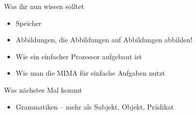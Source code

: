 %







\begin{frame}	
	\begin{block}{Was ihr nun wissen solltet}
		\begin{itemize}
			\item Speicher
			\item Abbildungen, die Abbildungen auf Abbildungen abbilden!
			\item Wie ein einfacher Prozessor aufgebaut ist
			\item Wie man die MIMA für einfache Aufgaben nutzt
		\end{itemize}
	\end{block}
	
	\begin{block}{Was nächstes Mal kommt}
		\begin{itemize}
			\item Grammatiken – mehr als Subjekt, Objekt, Prädikat
		\end{itemize}
	\end{block}
\end{frame}

\slideThanks

